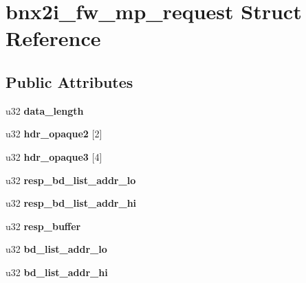 \hypertarget{structbnx2i__fw__mp__request}{
\section{bnx2i\_\-fw\_\-mp\_\-request Struct Reference}
\label{structbnx2i__fw__mp__request}
}
\subsection*{Public Attributes}
\begin{DoxyCompactItemize}
\item 
\hypertarget{structbnx2i__fw__mp__request_ad9cdd1230dd00c3222f728487fb2823f}{
u32 {\bfseries data\_\-length}}
\label{structbnx2i__fw__mp__request_ad9cdd1230dd00c3222f728487fb2823f}

\item 
\hypertarget{structbnx2i__fw__mp__request_a2ec46bcfe070ca897be175f4e11b15b8}{
u32 {\bfseries hdr\_\-opaque2} \mbox{[}2\mbox{]}}
\label{structbnx2i__fw__mp__request_a2ec46bcfe070ca897be175f4e11b15b8}

\item 
\hypertarget{structbnx2i__fw__mp__request_a91c59db2076a822b1348c481e0f083f4}{
u32 {\bfseries hdr\_\-opaque3} \mbox{[}4\mbox{]}}
\label{structbnx2i__fw__mp__request_a91c59db2076a822b1348c481e0f083f4}

\item 
\hypertarget{structbnx2i__fw__mp__request_a283c44c7ef62d361f7cb8bd5613edd83}{
u32 {\bfseries resp\_\-bd\_\-list\_\-addr\_\-lo}}
\label{structbnx2i__fw__mp__request_a283c44c7ef62d361f7cb8bd5613edd83}

\item 
\hypertarget{structbnx2i__fw__mp__request_a2573027a40e3bdedc07802ca9ab81be6}{
u32 {\bfseries resp\_\-bd\_\-list\_\-addr\_\-hi}}
\label{structbnx2i__fw__mp__request_a2573027a40e3bdedc07802ca9ab81be6}

\item 
\hypertarget{structbnx2i__fw__mp__request_a48a7e996e03328072b02dd2da211d6fd}{
u32 {\bfseries resp\_\-buffer}}
\label{structbnx2i__fw__mp__request_a48a7e996e03328072b02dd2da211d6fd}

\item 
\hypertarget{structbnx2i__fw__mp__request_a068b800df8063d98e3811f15f13cdb37}{
u32 {\bfseries bd\_\-list\_\-addr\_\-lo}}
\label{structbnx2i__fw__mp__request_a068b800df8063d98e3811f15f13cdb37}

\item 
\hypertarget{structbnx2i__fw__mp__request_afee2c20c90e6bd5bbff7c1151a288c69}{
u32 {\bfseries bd\_\-list\_\-addr\_\-hi}}
\label{structbnx2i__fw__mp__request_afee2c20c90e6bd5bbff7c1151a288c69}

\end{DoxyCompactItemize}


